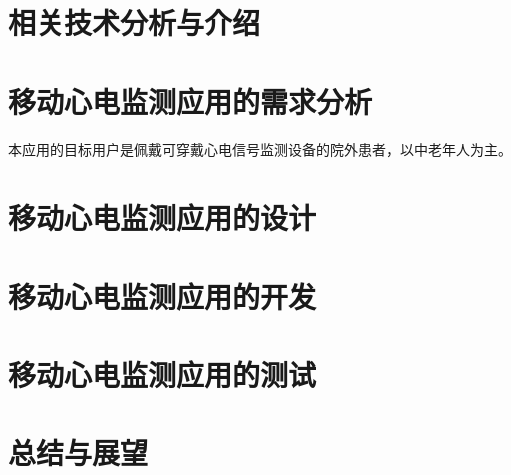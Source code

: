 \documentclass{ecnuthesis}
\begin{document}
    \newcommand*{\app}{移动心电监测应用}


    \frontmatter

    \begin{abstract}
    \end{abstract}

    \begin{abstractEN}
    \end{abstractEN}

    \mainmatter


    


    \chapter{相关技术分析与介绍}\label{ch:tech}



    \chapter{\app 的需求分析}\label{ch:requirement}


    本应用的目标用户是佩戴可穿戴心电信号监测设备的院外患者，以中老年人为主。


    \chapter{\app 的设计}\label{ch:design}



    \chapter{\app 的开发}\label{ch:development}



    \chapter{\app 的测试}\label{ch:test}



    \chapter{总结与展望}\label{ch:conclusion}
\end{document}

